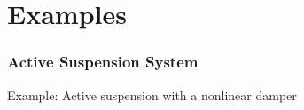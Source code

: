 \documentclass{beamer}
\begin{document}
\section[]{Examples}
  \frame
  {
    \frametitle{Active Suspension System}
    Example: Active suspension with a nonlinear damper
    \centerline{}
  }
\end{document}
